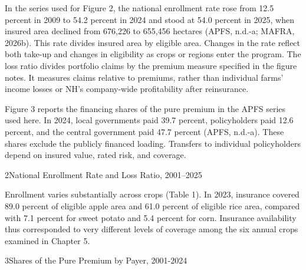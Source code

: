 In the series used for Figure 2, the national enrollment rate rose from 12.5 percent in 2009 to 54.2 percent in 2024 and stood at 54.0 percent in 2025, when insured area declined from 676,226 to 655,456 hectares (APFS, n.d.-a; MAFRA, 2026b). This rate divides insured area by eligible area. Changes in the rate reflect both take-up and changes in eligibility as crops or regions enter the program. The loss ratio divides portfolio claims by the premium measure specified in the figure notes. It measures claims relative to premiums, rather than individual farms' income losses or NH's company-wide profitability after reinsurance.

Figure 3 reports the financing shares of the pure premium in the APFS series used here. In 2024, local governments paid 39.7 percent, policyholders paid 12.6 percent, and the central government paid 47.7 percent (APFS, n.d.-a). These shares exclude the publicly financed loading. Transfers to individual policyholders depend on insured value, rated risk, and coverage.

\begin{wordfigure}{2}{National Enrollment Rate and Loss Ratio, 2001--2025}
\end{wordfigure}

Enrollment varies substantially across crops (Table 1). In 2023, insurance covered 89.0 percent of eligible apple area and 61.0 percent of eligible rice area, compared with 7.1 percent for sweet potato and 5.4 percent for corn. Insurance availability thus corresponded to very different levels of coverage among the six annual crops examined in Chapter 5.

\begin{wordfigure}{3}{Shares of the Pure Premium by Payer, 2001-2024}
\end{wordfigure}

